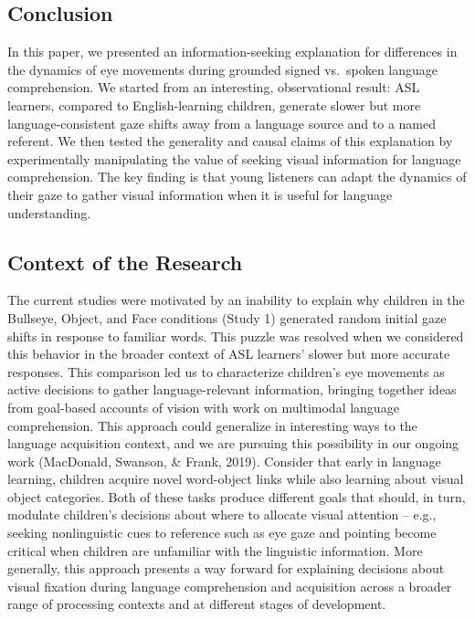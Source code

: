 \documentclass[,man,floatsintext]{apa6}
\begin{document}
\hypertarget{conclusion}{%
\subsection{Conclusion}\label{conclusion}}

In this paper, we presented an information-seeking explanation for differences in the dynamics of eye movements during grounded signed vs.~spoken language comprehension. We started from an interesting, observational result: ASL learners, compared to English-learning children, generate slower but more language-consistent gaze shifts away from a language source and to a named referent. We then tested the generality and causal claims of this explanation by experimentally manipulating the value of seeking visual information for language comprehension. The key finding is that young listeners can adapt the dynamics of their gaze to gather visual information when it is useful for language understanding.

\hypertarget{context-of-the-research}{%
\subsection{Context of the Research}\label{context-of-the-research}}

The current studies were motivated by an inability to explain why children in the Bullseye, Object, and Face conditions (Study 1) generated random initial gaze shifts in response to familiar words. This puzzle was resolved when we considered this behavior in the broader context of ASL learners' slower but more accurate responses. This comparison led us to characterize children's eye movements as active decisions to gather language-relevant information, bringing together ideas from goal-based accounts of vision with work on multimodal language comprehension. This approach could generalize in interesting ways to the language acquisition context, and we are pursuing this possibility in our ongoing work (MacDonald, Swanson, \& Frank, 2019). Consider that early in language learning, children acquire novel word-object links while also learning about visual object categories. Both of these tasks produce different goals that should, in turn, modulate children's decisions about where to allocate visual attention -- e.g., seeking nonlinguistic cues to reference such as eye gaze and pointing become critical when children are unfamiliar with the linguistic information. More generally, this approach presents a way forward for explaining decisions about visual fixation during language comprehension and acquisition across a broader range of processing contexts and at different stages of development.
\end{document}
